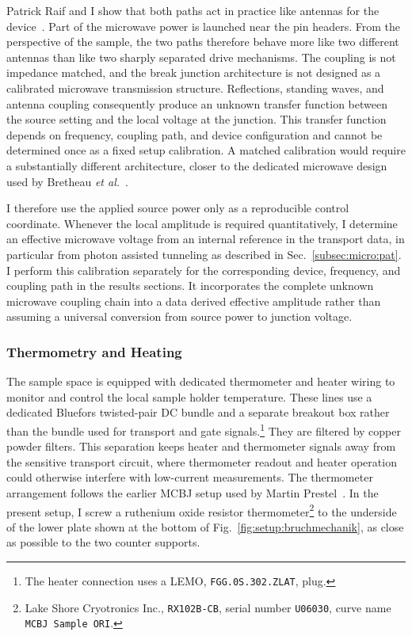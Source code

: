            Patrick Raif and I show that both paths act in practice like antennas for the device~\cite{raif_electronic_2024}. Part of the microwave power is launched near the pin headers. From the perspective of the sample, the two paths therefore behave more like two different antennas than like two sharply separated drive mechanisms. The coupling is not impedance matched, and the break junction architecture is not designed as a calibrated microwave transmission structure. Reflections, standing waves, and antenna coupling consequently produce an unknown transfer function between the source setting and the local voltage at the junction. This transfer function depends on frequency, coupling path, and device configuration and cannot be determined once as a fixed setup calibration. A matched calibration would require a substantially different architecture, closer to the dedicated microwave design used by Bretheau \textit{et al.}~\cite{bretheau_localized_2013}.

            I therefore use the applied source power only as a reproducible control coordinate. Whenever the local amplitude is required quantitatively, I determine an effective microwave voltage from an internal reference in the transport data, in particular from photon assisted tunneling as described in Sec.~\ref{subsec:micro:pat}. I perform this calibration separately for the corresponding device, frequency, and coupling path in the results sections. It incorporates the complete unknown microwave coupling chain into a data derived effective amplitude rather than assuming a universal conversion from source power to junction voltage.
        
        \newpage
        \subsubsection*{Thermometry and Heating}

            The sample space is equipped with dedicated thermometer and heater wiring to monitor and control the local sample holder temperature. These lines use a dedicated Bluefors twisted-pair DC bundle and a separate breakout box rather than the bundle used for transport and gate signals.\footnote{The heater connection uses a LEMO, \texttt{FGG.0S.302.ZLAT}, plug.} They are filtered by copper powder filters. This separation keeps heater and thermometer signals away from the sensitive transport circuit, where thermometer readout and heater operation could otherwise interfere with low-current measurements. The thermometer arrangement follows the earlier MCBJ setup used by Martin Prestel~\cite{prestel_magnetic_2020}. In the present setup, I screw a ruthenium oxide resistor thermometer\footnote{Lake Shore Cryotronics Inc., \texttt{RX102B-CB}, serial number \texttt{U06030}, curve name \texttt{MCBJ Sample ORI}.} to the underside of the lower plate shown at the bottom of Fig.~\ref{fig:setup:bruchmechanik}, as close as possible to the two counter supports.

